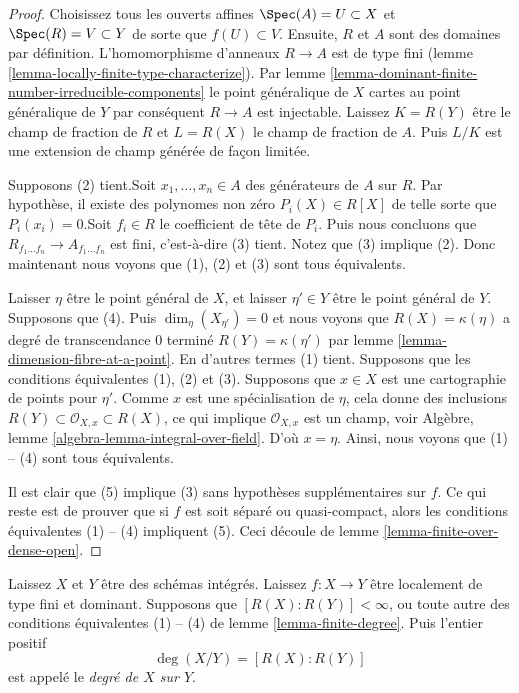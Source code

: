 \begin{proof}
Choisissez tous les ouverts affines $\Spec(A) = U \subset X$ et $\Spec(R) = V \subset Y$ de sorte que $f(U) \subset V$. Ensuite, $R$ et $A$ sont des domaines par définition. L'homomorphisme d'anneaux $R \to A$ est de type fini (lemme \ref{lemma-locally-finite-type-characterize}). Par lemme \ref{lemma-dominant-finite-number-irreducible-components} le point généralique de $X$ cartes au point généralique de $Y$ par conséquent $R \to A$ est injectable. Laissez $K = R(Y)$ être le champ de fraction de $R$ et $L = R(X)$ le champ de fraction de $A$. Puis $L/K$ est une extension de champ générée de façon limitée.

\medskip\noindent
Supposons (2) tient.Soit $x_1, \ldots, x_n \in A$ des générateurs de $A$ sur $R$. Par hypothèse, il existe des polynomes non zéro $P_i(X) \in R[X]$ de telle sorte que $P_i(x_i) = 0$.Soit $f_i \in R$ le coefficient de tête de $P_i$. Puis nous concluons que $R_{f_1 \ldots f_n} \to A_{f_1 \ldots f_n}$ est fini, c'est-à-dire (3) tient. Notez que (3) implique (2). Donc maintenant nous voyons que (1), (2) et (3) sont tous équivalents.

\medskip\noindent

Laisser $\eta$ être le point général de $X$, et laisser $\eta' \in Y$ être le point général de $Y$. Supposons que (4). Puis
$\dim_\eta(X_{\eta'}) = 0$ et nous voyons que $R(X) = \kappa(\eta)$ a degré de transcendance $0$ terminé $R(Y) = \kappa(\eta')$ par lemme \ref{lemma-dimension-fibre-at-a-point}. En d'autres termes (1) tient. Supposons que les conditions équivalentes (1), (2) et (3). Supposons que $x \in X$ est une cartographie de points pour $\eta'$. Comme $x$ est une spécialisation de $\eta$, cela donne des inclusions $R(Y) \subset \mathcal{O}_{X, x} \subset R(X)$, ce qui implique $\mathcal{O}_{X, x}$ est un champ, voir Algèbre, lemme \ref{algebra-lemma-integral-over-field}. D'où $x = \eta$. Ainsi, nous voyons que (1) -- (4) sont tous équivalents.

\medskip\noindent
Il est clair que (5) implique (3) sans hypothèses supplémentaires sur $f$. Ce qui reste est de prouver que si $f$ est soit séparé ou quasi-compact, alors les conditions équivalentes (1) -- (4) impliquent (5). Ceci découle de lemme \ref{lemma-finite-over-dense-open}.
\end{proof}

\begin{definition}

\label{definition-degree}
Laissez $X$ et $Y$ être des schémas intégrés. Laissez $f : X \to Y$ être localement de type fini et dominant. Supposons que $[R(X) : R(Y)] < \infty$, ou toute autre des conditions équivalentes (1) -- (4) de lemme \ref{lemma-finite-degree}. Puis l'entier positif $$
\deg(X/Y) = [R(X) : R(Y)]
$$ est appelé le {\it degré de $X$ sur $Y$}.
\end{definition}

